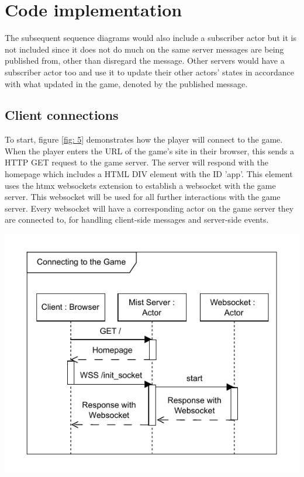 \documentclass[]{final}
\begin{document}
\newpage

\section{Code implementation}

The subsequent sequence diagrams would also include a subscriber actor
but it is not included since it does not do much on the same server
messages are being published from, other than disregard the message.
Other servers would have a subscriber actor too and use it to update
their other actors' states in accordance with what updated in the game,
denoted by the published message.

\subsection{Client connections}

\noindent
\begin{minipage}[t]{18em}
  \vspace*{-6cm}

  To start, figure \ref{fig: 5} demonstrates how the player will connect to the game.
  When the player enters the URL of the game's site in their browser, this sends a HTTP
  GET request to the game server. The server will respond with the homepage which
  includes a HTML DIV element with the ID 'app'. This element uses the htmx websockets
  extension to establish a websocket with the game server. This websocket will be
  used for all further interactions with the game server. Every websocket will have a corresponding
  actor on the game server they are connected to, for handling client-side messages and
  server-side events.
\end{minipage}
\hfill
\begin{minipage}[t]{20em}
  \includegraphics[width=\textwidth]{sequence_connecting}
  \label{fig: 5}
\end{minipage}
\end{document}
